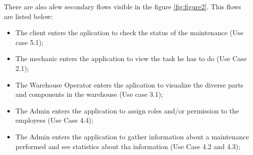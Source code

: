 There are also afew secondary flows visible in the figure \ref{fig:figure2}. 
This flows are listed below:
\begin{itemize}
  \item The client enters the aplication to check the status of the maintenance (Use case 5.1);
  \item The mechanic enters the application to view the task he has to do (Use Case 2.1); 
  \item The Warehouse Operator enters the aplication to visualize the diverse parts and components in the warehouse (Use case 3.1); 
  \item The Admin enters the application to assign roles and/or permission to the employees (Use Case 4.4); 
  \item The Admin enters the application to gather information about a maintenance performed and see statistics about tha information (Use Case 4.2 and 4.3); 
\end{itemize}
 








